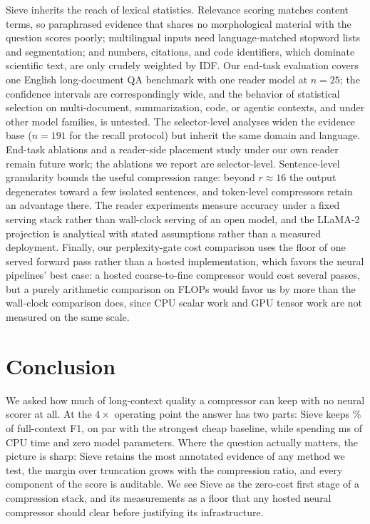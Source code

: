 \documentclass{article}
\newcommand{\method}{Sieve}
\begin{document}
\method{} inherits the reach of lexical statistics. Relevance scoring
matches content terms, so paraphrased evidence that shares no
morphological material with the question scores poorly; multilingual
inputs need language-matched stopword lists and segmentation; and
numbers, citations, and code identifiers, which dominate scientific
text, are only crudely weighted by IDF. Our end-task evaluation covers
one English long-document QA benchmark with one reader model at
$n=25$; the confidence intervals are correspondingly wide, and the
behavior of statistical selection on multi-document, summarization,
code, or agentic contexts, and under other model families, is untested.
The selector-level analyses widen the evidence base ($n=191$ for the
recall protocol) but inherit the same domain and language. End-task
ablations and a reader-side placement study under our own reader remain
future work; the ablations we report are selector-level. Sentence-level
granularity bounds the
useful compression range: beyond $r \approx 16$ the output degenerates
toward a few isolated sentences, and token-level compressors retain an
advantage there. The reader experiments measure accuracy under a fixed
serving stack rather than wall-clock serving of an open model, and the
LLaMA-2 projection is analytical with stated assumptions rather than a
measured deployment. Finally, our perplexity-gate cost comparison uses
the floor of one served forward pass rather than a hosted
implementation, which favors the neural pipelines' best case: a hosted
coarse-to-fine compressor would cost several passes, but a purely
arithmetic comparison on FLOPs would favor us by more than the
wall-clock comparison does, since CPU scalar work and GPU tensor work
are not measured on the same scale.

\section{Conclusion}
\label{sec:conclusion}

We asked how much of long-context quality a compressor can keep with no
neural scorer at all. At the $4\times$ operating point the answer has two
parts: \method{} keeps \RetSieve\% of full-context F1, on par with
the strongest cheap baseline, while spending \TimeSieveSixk{} ms of CPU
time and zero model parameters. Where the question actually matters,
the picture is sharp: \method{} retains the most annotated evidence of
any method we test, the margin over truncation grows with the
compression ratio, and every component of the score is auditable. We see
\method{} as the zero-cost first stage of a compression stack, and its
measurements as a floor that any hosted neural compressor should clear
before justifying its infrastructure.
\end{document}
